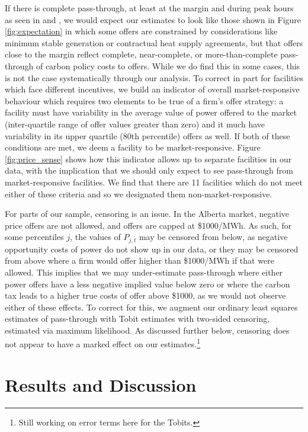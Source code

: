 \documentclass[12pt]{article}
\begin{document}
If there is complete pass-through, at least at the margin and during peak hours as seen in \cite{fabra_reguant} and \cite{hintermann16_germany}, we would expect our estimates to look like those shown in Figure \ref{fig:expectation} in which some offers are constrained by considerations like minimum stable generation or contractual heat supply agreements, but that offers close to the margin reflect complete, near-complete, or more-than-complete pass-through of carbon policy costs to offers.  While we do find this in some cases, this is not the case systematically through our analysis. To correct in part for facilities which face different incentives, we build an indicator of overall market-responsive behaviour which requires two elements to be true of a firm's offer strategy: a facility must have variability in the average value of power offered to the market (inter-quartile range of offer values greater than zero) and it much have variability in its upper quartile (80th percentile) offers as well. If both of these conditions are met, we deem a facility to be market-responsive.  Figure \ref{fig:price_sense} shows how this indicator allows up to separate facilities in our data, with the implication that we should only expect to see pass-through from market-responsive facilities. We find that there are 11 facilities which do not meet either of these criteria and so we designated them non-market-responsive. 






For parts of our sample, censoring is an issue. In the Alberta market, negative price offers are not allowed, and offers are capped at \$1000/MWh. As such, for some percentiles $j$, the values of $P_{j,t}$ may be censored from below, as negative opportunity costs of power do not show up in our data, or they may be censored from above where a firm would offer higher than \$1000/MWh if that were allowed. This implies that we may under-estimate pass-through where either power offers have a less negative implied value below zero or where the carbon tax leads to a higher true costs of offer above \$1000, as we would not observe either of these effects. To correct for this, we augment our ordinary least squares estimates of pass-through with Tobit estimates with two-sided censoring, estimated via maximum likelihood. As discussed further below, censoring does not appear to have a marked effect on our estimates.\footnote{Still working on error terms here for the Tobits.}

\section{Results and Discussion}\label{sec:results}
\end{document}
